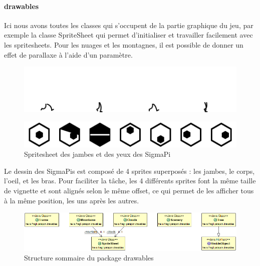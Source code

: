 \documentclass[a4paper,10pt]{article}
\begin{document}
  \paragraph{drawables}
  Ici nous avons toutes les classes qui s'occupent de la partie graphique du jeu, par exemple la classe SpriteSheet qui permet d'initialiser et travailler facilement avec les spritesheets. Pour les nuages et les montagnes, il est possible de donner un effet de parallaxe à l'aide d'un paramètre.
 \begin{figure}[!h]
 \centering
 \vspace{-45pt}
 \includegraphics[scale=0.3]{images/legs}
 \end{figure}
  \begin{figure}[!h]
 \centering
 \includegraphics[scale=0.3]{images/eyes}
 \caption{Spritesheet des jambes et des yeux des SigmaPi}
 \end{figure}
 Le dessin des SigmaPis est composé de 4 sprites superposés : les jambes, le corps, l'oeil, et les bras. Pour faciliter la tâche, les 4 différents sprites font la même taille de vignette et sont alignés selon le même offset, ce qui permet de les afficher tous à la même position, les uns après les autres.
 \begin{figure}[!h]
 \centering
 \includegraphics[scale=0.4]{images/Drawables}
 \caption{Structure sommaire du package drawables}
 \end{figure}
\end{document}
